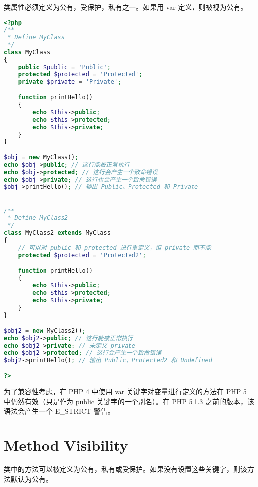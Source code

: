 类属性必须定义为公有，受保护，私有之一。如果用 var 定义，则被视为公有。

\begin{lstlisting}[language=PHP]
<?php
/**
 * Define MyClass
 */
class MyClass
{
    public $public = 'Public';
    protected $protected = 'Protected';
    private $private = 'Private';

    function printHello()
    {
        echo $this->public;
        echo $this->protected;
        echo $this->private;
    }
}

$obj = new MyClass();
echo $obj->public; // 这行能被正常执行
echo $obj->protected; // 这行会产生一个致命错误
echo $obj->private; // 这行也会产生一个致命错误
$obj->printHello(); // 输出 Public、Protected 和 Private


/**
 * Define MyClass2
 */
class MyClass2 extends MyClass
{
    // 可以对 public 和 protected 进行重定义，但 private 而不能
    protected $protected = 'Protected2';

    function printHello()
    {
        echo $this->public;
        echo $this->protected;
        echo $this->private;
    }
}

$obj2 = new MyClass2();
echo $obj2->public; // 这行能被正常执行
echo $obj2->private; // 未定义 private
echo $obj2->protected; // 这行会产生一个致命错误
$obj2->printHello(); // 输出 Public、Protected2 和 Undefined

?>
\end{lstlisting}


为了兼容性考虑，在 PHP 4 中使用 var 关键字对变量进行定义的方法在 PHP 5 中仍然有效（只是作为 public 关键字的一个别名）。在 PHP 5.1.3 之前的版本，该语法会产生一个 E\_STRICT 警告。


\section{Method Visibility}

类中的方法可以被定义为公有，私有或受保护。如果没有设置这些关键字，则该方法默认为公有。


